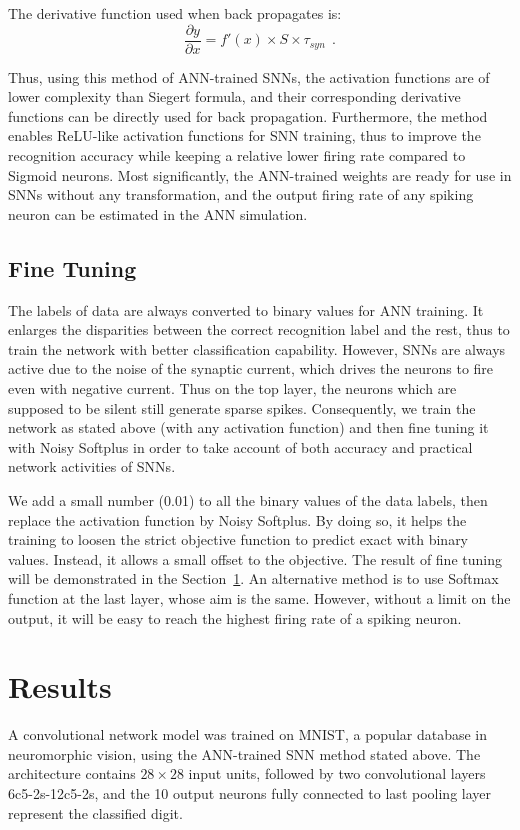 	
	
	The derivative function used when back propagates is:
	\begin{equation}
	\frac{\partial y}{\partial x} = f'(x) \times S \times \tau_{syn}~~.
	\end{equation}
	

	
	Thus, using this method of ANN-trained SNNs, the activation functions are of lower complexity than Siegert formula, and their corresponding derivative functions can be directly used for back propagation.
	Furthermore, the method enables ReLU-like activation functions for SNN training, thus to improve the recognition accuracy while keeping a relative lower firing rate compared to Sigmoid neurons. 
	Most significantly, the ANN-trained weights are ready for use in SNNs without any transformation, and the output firing rate of any spiking neuron can be estimated in the ANN simulation.
	
	
	\subsection{Fine Tuning}
	The labels of data are always converted to binary values for ANN training.
	It enlarges the disparities between the correct recognition label and the rest, thus to train the network with better classification capability.
	However, SNNs are always active due to the noise of the synaptic current, which drives the neurons to fire even with negative current.
	Thus on the top layer, the neurons which are supposed to be silent still generate sparse spikes.
	Consequently, we train the network as stated above (with any activation function) and then fine tuning it with Noisy Softplus in order to take account of both accuracy and practical network activities of SNNs.
	
	We add a small number (0.01) to all the binary values of the data labels,	then replace the activation function by Noisy Softplus.
	By doing so, it helps the training to loosen the strict objective function to predict exact with binary values.
	Instead, it allows a small offset to the objective.
	The result of fine tuning will be demonstrated in the Section~\ref{sec:iconipResult}.
	An alternative method is to use Softmax function at the last layer, whose aim is the same.
	However, without a limit on the output, it will be easy to reach the highest firing rate of a spiking neuron.
	
\section{Results}
\label{sec:iconipResult}
	A convolutional network model was trained on MNIST,
	a popular database in neuromorphic vision, using the ANN-trained SNN method stated above.
	The architecture contains $28\times28$ input units, followed by two convolutional layers 6c5-2s-12c5-2s, and the 10 output neurons fully connected to last pooling layer represent the classified digit.
	

